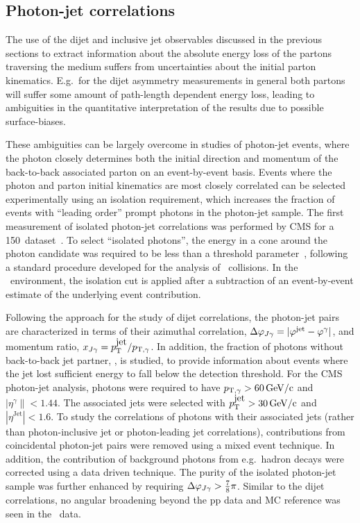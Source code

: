 \subsection{Photon-jet correlations}

The use of the dijet and inclusive jet observables discussed in the previous sections
to extract information
about the absolute energy loss of the partons traversing the medium suffers from
uncertainties about the initial parton kinematics. E.g.\ for the dijet asymmetry
measurements in general both partons will suffer some amount of path-length dependent
energy loss, leading to ambiguities in the quantitative interpretation of the results
due to possible surface-biases.

These ambiguities can be largely overcome in studies of photon-jet events,
where the photon closely determines both the initial direction and momentum
of the back-to-back associated parton on an event-by-event basis.
Events where the photon and parton initial kinematics are most closely correlated
can be selected experimentally using an isolation requirement, which
increases the fraction of events with ``leading order'' prompt photons in
the photon-jet sample. The first measurement of isolated photon-jet correlations
was performed by CMS for a 150\mubinv \PbPb\ dataset~\cite{Chatrchyan:2012gt}.
To select ``isolated photons'', the energy in a cone around 
the photon candidate was required to be less than a threshold parameter~\cite{HIPhoton},
following a standard procedure developed for the analysis of \pp\ collisions. In the \PbPb\ 
environment, the isolation cut is applied after a subtraction of an event-by-event 
estimate of the underlying event contribution.

Following the approach for the study of dijet correlations, the photon-jet pairs
are characterized in terms of their azimuthal correlation, $\Delta\varphi_{J\gamma} = |\varphi^\mathrm{jet} - \varphi^{\gamma}|$,
 and momentum ratio, $x_{J\gamma} = p_{\mathrm{T}}^{\mbox{jet}}/p_{\mathrm{T},\gamma}$. In addition, the fraction of photons without
back-to-back jet partner,  \rjg, is studied, to provide information about
events where the jet lost sufficient energy to fall below the detection threshold.
For the CMS photon-jet analysis, photons were required to have $p_{\mathrm{T},\gamma} > 60\,\mathrm{GeV/c}$
and  $|\eta^\gamma\|<1.44$. The associated jets were selected with
$p_{\mathrm{T}}^{\mbox{jet}} > 30\,\mathrm{GeV/c}$ and $|\eta^{\mbox{Jet}}|<1.6$. To study the correlations of
photons with their associated jets (rather than photon-inclusive jet or photon-leading
jet correlations), contributions from
coincidental photon-jet pairs were removed using a mixed event technique. In
addition, the contribution of background photons from e.g.\ hadron decays
were corrected using a data driven technique. The purity of the isolated photon-jet
sample was further enhanced by requiring $\Delta\varphi_{J\gamma} > \frac{7}{8}\pi$.
Similar to the dijet correlations, no angular broadening
beyond the pp data and MC reference was seen in the \PbPb\ data.

